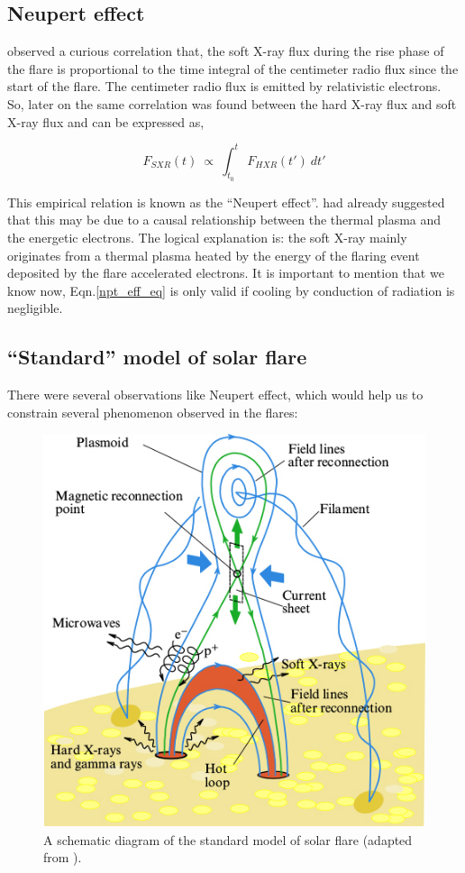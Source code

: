 \subsection{Neupert effect}\label{npt_eff}

\cite{neupert68} observed a curious correlation that, the soft X-ray flux during the rise phase of the flare is proportional to the time integral of the centimeter radio flux since the start of the flare. The centimeter radio flux is emitted by relativistic electrons. So, later on the same correlation was found between the hard X-ray flux and soft X-ray flux and can be expressed as,

\begin{equation}\label{npt_eff_eq}
    F_{SXR}(t)~\propto~\int_{t_{0}}^{t}~F_{HXR}(t')~dt'
\end{equation}

This empirical relation is known as the ``Neupert effect''. \cite{neupert68} had already suggested that this may be due to a causal relationship between the thermal plasma and the energetic electrons. The logical explanation is: the soft X-ray mainly originates from a thermal plasma heated by the energy of the flaring event deposited by the flare accelerated electrons. It is important to mention that we know now, Eqn.\ref{npt_eff_eq} is only valid if cooling by conduction of radiation is negligible.

\subsection{``Standard'' model of solar flare}\label{sol_flr_std_mod}

There were several observations like Neupert effect, which would help us to constrain several phenomenon observed in the flares:

\begin{figure}[ht!]
    \centering
    \includegraphics[width=0.5\linewidth]{Figures/phu_63_8_818_f2.jpg}
    \caption{A schematic diagram of the standard model of solar flare (adapted from \cite{lysenko20}).}
\end{figure}

